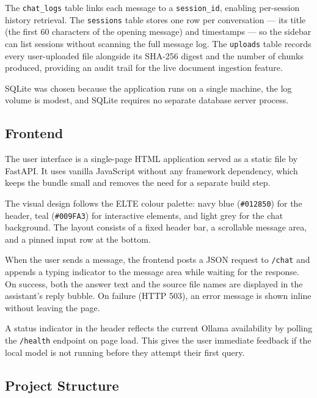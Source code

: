 The \texttt{chat\_logs} table links each message to a \texttt{session\_id}, enabling per-session history retrieval. The \texttt{sessions} table stores one row per conversation — its title (the first 60 characters of the opening message) and timestamps — so the sidebar can list sessions without scanning the full message log. The \texttt{uploads} table records every user-uploaded file alongside its SHA-256 digest and the number of chunks produced, providing an audit trail for the live document ingestion feature.

SQLite was chosen because the application runs on a single machine, the log volume is modest, and SQLite requires no separate database server process.

\subsection{Frontend}
\label{sec:impl-frontend}

The user interface is a single-page HTML application served as a static file by FastAPI. It uses vanilla JavaScript without any framework dependency, which keeps the bundle small and removes the need for a separate build step.

The visual design follows the ELTE colour palette: navy blue (\texttt{\#012850}) for the header, teal (\texttt{\#009FA3}) for interactive elements, and light grey for the chat background. The layout consists of a fixed header bar, a scrollable message area, and a pinned input row at the bottom.

When the user sends a message, the frontend posts a JSON request to \texttt{/chat} and appends a typing indicator to the message area while waiting for the response. On success, both the answer text and the source file names are displayed in the assistant's reply bubble. On failure (HTTP 503), an error message is shown inline without leaving the page.

A status indicator in the header reflects the current Ollama availability by polling the \texttt{/health} endpoint on page load. This gives the user immediate feedback if the local model is not running before they attempt their first query.

\subsection{Project Structure}
\label{sec:impl-structure}

